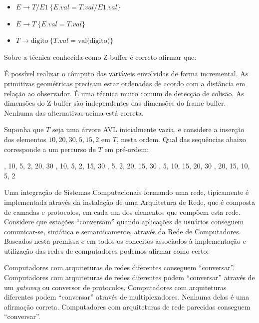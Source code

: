 \documentclass[12pt, addpoints]{exam}
\begin{document}
\begin{questions}
\begin{itemize}
    \item \( E \rightarrow T / E1 \ \{ E.val = T.val / E1.val \} \)

    \item \( E \rightarrow T \ \{ E.val = T.val \} \)

    \item \( T \rightarrow \text{digito} \ \{ T.val = \text{val(digito)} \} \)

\end{itemize}


\begin{choices}
\end{choices}

\question

Sobre a técnica conhecida como Z-buffer é correto afirmar que:
\begin{choices}
\choice É possível realizar o cômputo das variáveis envolvidas de forma incremental.
\choice As primitivas geométricas precisam estar ordenadas de acordo com a distância em relação ao observador. 
\choice É uma técnica muito comum de detecção de colisão. 
\choice As dimensões do Z-buffer são independentes das dimensões do frame buffer. 
\choice Nenhuma das alternativas acima está correta. 
\end{choices}

\question

Suponha que \( T \) seja uma árvore AVL inicialmente vazia, e considere a inserção dos elementos \(10, 20, 30, 5, 15, 2\) em \( T \), nesta ordem. Qual das sequências abaixo corresponde a um percurso de \( T \) em pré-ordem:
\begin{choices}
, 10, 5, 2, 20, 30
, 10, 5, 2, 15, 30
, 5, 2, 20, 15, 30
, 5, 10, 15, 20, 30
, 20, 15, 10, 5, 2
\end{choices}

\question

Uma integração de Sistemas Computacionais formando uma rede, tipicamente é implementada através da instalação de uma Arquitetura de Rede, que é composta de camadas e protocolos, em cada um dos elementos que compõem esta rede. Considere que estações “conversam” quando aplicações de usuários conseguem comunicar-se, sintática e semanticamente, através da Rede de Computadores. Baseados nesta premissa e em todos os conceitos associados à implementação e utilização das redes de computadores podemos afirmar como certo:


\begin{choices}
\choice Computadores com arquiteturas de redes diferentes conseguem “conversar”.
\choice Computadores com arquiteturas de redes diferentes podem “conversar” através de um \textit{gateway} ou conversor de protocolos.
\choice Computadores com arquiteturas diferentes podem “conversar” através de multiplexadores.
\choice Nenhuma delas é uma afirmação correta.
\choice Computadores com arquiteturas de rede parecidas conseguem “conversar”.
\end{choices}


\end{questions}
\end{document}
